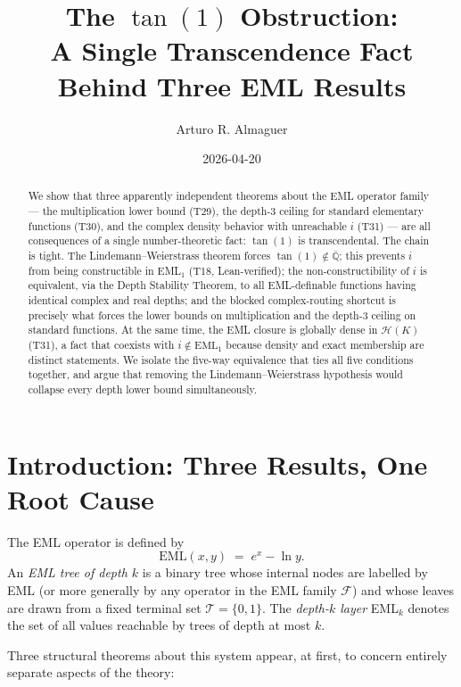 \documentclass[11pt]{article}
\title{The \(\tan(1)\) Obstruction:\\
       A Single Transcendence Fact Behind Three EML Results}
\author{Arturo R. Almaguer}
\date{2026-04-20}
\begin{document}
\maketitle

\begin{abstract}
We show that three apparently independent theorems about the EML operator family ---
the multiplication lower bound (T29), the depth-3 ceiling for standard elementary
functions (T30), and the complex density behavior with unreachable $i$ (T31) ---
are all consequences of a single number-theoretic fact: $\tan(1)$ is transcendental.
The chain is tight.  The Lindemann--Weierstrass theorem forces $\tan(1) \notin \overline{\mathbb{Q}}$;
this prevents $i$ from being constructible in EML$_1$ (T18, Lean-verified);
the non-constructibility of $i$ is equivalent, via the Depth Stability Theorem, to
all EML-definable functions having identical complex and real depths; and the blocked
complex-routing shortcut is precisely what forces the lower bounds on multiplication
and the depth-3 ceiling on standard functions.  At the same time, the EML closure
is globally dense in $\mathcal{H}(K)$ (T31), a fact that coexists with $i \notin \text{EML}_1$
because density and exact membership are distinct statements.
We isolate the five-way equivalence that ties all five conditions together, and argue
that removing the Lindemann--Weierstrass hypothesis would collapse every depth
lower bound simultaneously.
\end{abstract}

\tableofcontents

\section{Introduction: Three Results, One Root Cause}

The EML operator is defined by
\[
  \mathrm{EML}(x, y) \;=\; e^x - \ln y.
\]
An \emph{EML tree of depth $k$} is a binary tree whose internal nodes are labelled
by EML (or more generally by any operator in the EML family $\mathcal{F}$) and
whose leaves are drawn from a fixed terminal set $\mathcal{T} = \{0, 1\}$.
The \emph{depth-$k$ layer} EML$_k$ denotes the set of all values reachable by
trees of depth at most $k$.

Three structural theorems about this system appear, at first, to concern
entirely separate aspects of the theory:
\end{document}
